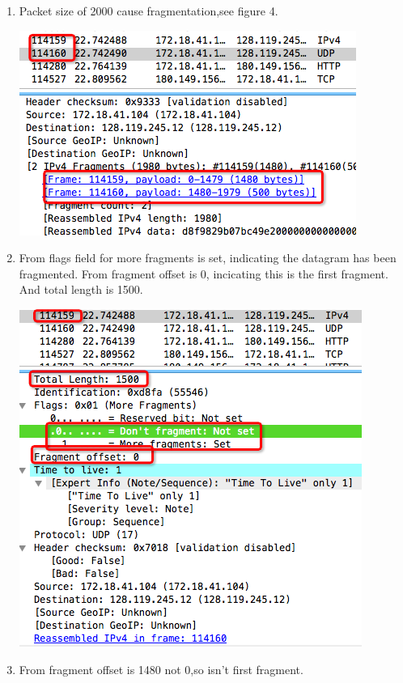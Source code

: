 \documentclass[a4paper]{article}
\begin{document}
{\begin{enumerate}
	  and the TTL of first hop router is always the same,the distance between my computer and router is constant.
	\item Packet size of 2000 cause fragmentation,see figure 4. 
	\begin{center} \includegraphics[scale=0.5]{Illustrations/4.png} \end{center}
	\item From flags field for more fragments is set, indicating the datagram has been fragmented. From fragment offset is 0, incicating this is the first fragment.
	  And total length is 1500.
	\begin{center} \includegraphics[scale=0.5]{Illustrations/5.png} \end{center}
	\item From fragment offset is 1480 not 0,so isn't first fragment.

\end{enumerate}}
\end{document}
